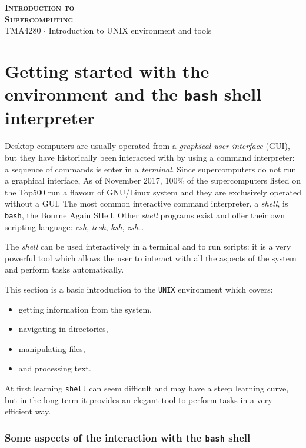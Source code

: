 \documentclass[onecolumn, oneside, a4paper, 11pt]{memoir}
\theoremstyle{remark}
\begin{document}
\pagestyle{empty}

\begin{center}
  {\Huge \bfseries \scshape
    Introduction to \\[0.2\baselineskip] Supercomputing} \\[2\baselineskip]
  {\Large TMA4280 $\cdot$ Introduction to UNIX environment and tools} \\[2\baselineskip]
\end{center}

\section{Getting started with the environment and the \texttt{bash} shell interpreter}


Desktop computers are usually operated from a  \textit{graphical user interface} (GUI), but they have historically been interacted with by using a command interpreter: a sequence of commands is enter in a \textit{terminal}.
Since supercomputers do not run a graphical interface,
As of November 2017, 100\% of the supercomputers listed on the Top500 run a flavour of GNU/Linux system and they are exclusively operated without a GUI.
The most common interactive command interpreter, a \textit{shell}, is \texttt{bash}, the Bourne Again SHell. Other \textit{shell} programs exist and offer their own scripting language: \textit{csh}, \textit{tcsh}, \textit{ksh}, \textit{zsh}\dots

The \textit{shell} can be used interactively in a terminal and to run scripts: it is a very powerful tool which allows the user to interact with all the aspects of the system and perform tasks automatically.

\medskip
This section is a basic introduction to the \texttt{UNIX} environment which covers:
\begin{itemize}
\item getting information from the system,
\item navigating in directories,
\item manipulating files,
\item and processing text.
\end{itemize}

\medskip
At first learning \texttt{shell} can seem difficult and may have a steep learning curve, but in the long term it provides an elegant tool to perform tasks in a very efficient way. 

\subsubsection{Some aspects of the interaction with the \texttt{bash} shell}
\end{document}
